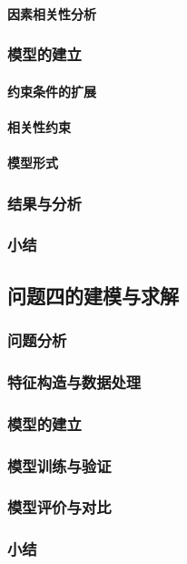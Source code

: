 \documentclass[withoutpreface]{cumcmthesis}
\begin{document}
\paragraph{因素相关性分析}
\subsubsection{模型的建立}
\paragraph{约束条件的扩展}
\paragraph{相关性约束}
\paragraph{模型形式}
\subsubsection{结果与分析}
\subsubsection{小结}

\subsection{问题四的建模与求解}
\subsubsection{问题分析}
\subsubsection{特征构造与数据处理}
\subsubsection{模型的建立}
\subsubsection{模型训练与验证}
\subsubsection{模型评价与对比}
\subsubsection{小结}
\end{document}
